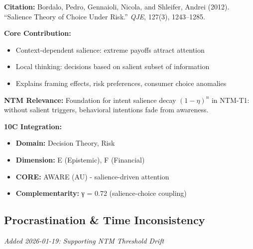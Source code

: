 \begin{tcolorbox}[colback=yellow!5!white,colframe=yellow!75!black,title=Key Paper: Bordalo et al. (2012)]
\textbf{Citation:} Bordalo, Pedro, Gennaioli, Nicola, and Shleifer, Andrei (2012). ``Salience Theory of Choice Under Risk.'' \textit{QJE}, 127(3), 1243--1285.

\textbf{Core Contribution:}
\begin{itemize}[nosep]
    \item Context-dependent salience: extreme payoffs attract attention
    \item Local thinking: decisions based on salient subset of information
    \item Explains framing effects, risk preferences, consumer choice anomalies
\end{itemize}

\textbf{NTM Relevance:} Foundation for intent salience decay $(1-\eta)^n$ in NTM-T1: without salient triggers, behavioral intentions fade from awareness.

\textbf{10C Integration:}
\begin{itemize}[nosep]
    \item \textbf{Domain:} Decision Theory, Risk
    \item \textbf{Dimension:} E (Epistemic), F (Financial)
    \item \textbf{CORE:} AWARE (AU) - salience-driven attention
    \item \textbf{Complementarity:} γ = 0.72 (salience-choice coupling)
\end{itemize}
\end{tcolorbox}

\subsection{Procrastination \& Time Inconsistency}
\label{subsec:ot-procrastination}

\textit{Added 2026-01-19: Supporting NTM Threshold Drift}

